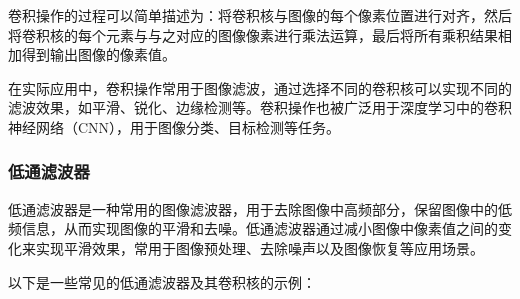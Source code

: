 \documentclass[a4paper,12pt]{article}
\begin{document}
卷积操作的过程可以简单描述为：将卷积核与图像的每个像素位置进行对齐，然后将卷积核的每个元素与与之对应的图像像素进行乘法运算，最后将所有乘积结果相加得到输出图像的像素值。

在实际应用中，卷积操作常用于图像滤波，通过选择不同的卷积核可以实现不同的滤波效果，如平滑、锐化、边缘检测等。卷积操作也被广泛用于深度学习中的卷积神经网络（CNN），用于图像分类、目标检测等任务。
\subsubsection{低通滤波器}
低通滤波器是一种常用的图像滤波器，用于去除图像中高频部分，保留图像中的低频信息，从而实现图像的平滑和去噪。低通滤波器通过减小图像中像素值之间的变化来实现平滑效果，常用于图像预处理、去除噪声以及图像恢复等应用场景。

以下是一些常见的低通滤波器及其卷积核的示例：
\end{document}
